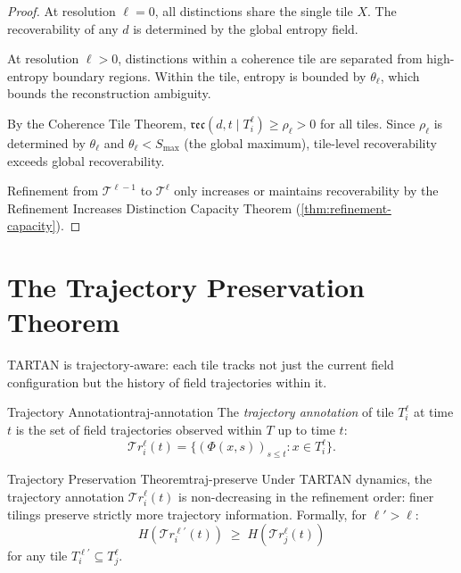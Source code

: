 \documentclass[12pt,twoside,openright]{book}
\newcommand{\reco}{\mathfrak{rec}}
\begin{document}
\begin{proof}
  At resolution $\ell = 0$, all distinctions share the
  single tile $X$. The recoverability of any $d$ is
  determined by the global entropy field.

  At resolution $\ell > 0$, distinctions within a
  coherence tile are separated from high-entropy
  boundary regions. Within the tile, entropy is
  bounded by $\theta_\ell$, which bounds the
  reconstruction ambiguity.

  By the Coherence Tile Theorem,
  $\reco(d, t \mid T^\ell_i) \ge \rho_\ell > 0$ for
  all tiles. Since $\rho_\ell$ is determined by
  $\theta_\ell$ and $\theta_\ell < S_{\max}$ (the
  global maximum), tile-level recoverability exceeds
  global recoverability.

  Refinement from $\mathcal{T}^{\ell-1}$ to
  $\mathcal{T}^\ell$ only increases or maintains
  recoverability by the Refinement Increases Distinction
  Capacity Theorem (\cref{thm:refinement-capacity}).
\end{proof}

\section{The Trajectory Preservation Theorem}

TARTAN is trajectory-aware: each tile tracks not just
the current field configuration but the history of
field trajectories within it.

\begin{definition}{Trajectory Annotation}{traj-annotation}
  The \emph{trajectory annotation} of tile $T^\ell_i$
  at time $t$ is the set of field trajectories
  observed within $T$ up to time $t$:
  \[
    \mathcal{T}\!r^\ell_i(t)
    = \{(\Phi(x,s))_{s \le t} : x \in T^\ell_i\}.
  \]
\end{definition}

\begin{theorem}{Trajectory Preservation Theorem}{traj-preserve}
  Under TARTAN dynamics, the trajectory annotation
  $\mathcal{T}\!r^\ell_i(t)$ is non-decreasing in
  the refinement order: finer tilings preserve
  strictly more trajectory information.
  Formally, for $\ell' > \ell$:
  \[
    H(\mathcal{T}\!r^{\ell'}_i(t))
    \;\ge\;
    H(\mathcal{T}\!r^{\ell}_j(t))
  \]
  for any tile $T^{\ell'}_i \subseteq T^\ell_j$.
\end{theorem}
\end{document}
